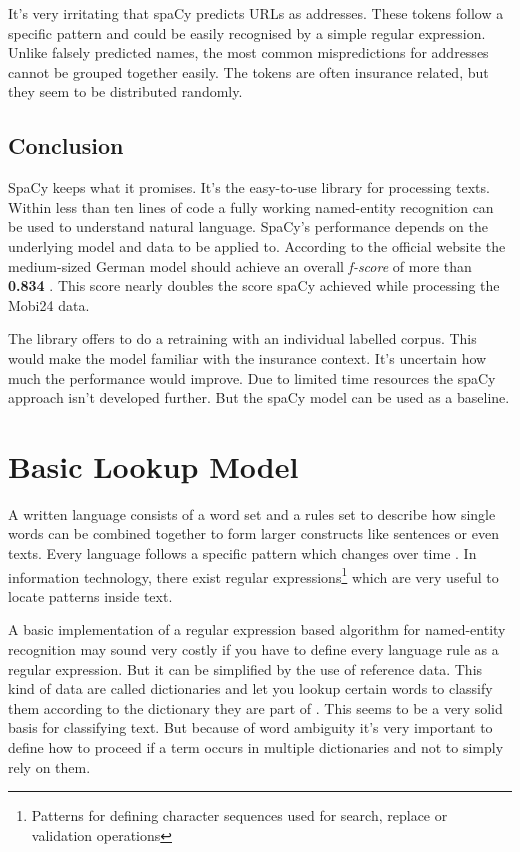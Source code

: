 It's very irritating that spaCy predicts URLs as addresses. These tokens follow a specific pattern and could be easily recognised by a simple regular expression. Unlike falsely predicted names, the most common mispredictions for addresses cannot be grouped together easily. The tokens are often insurance related, but they seem to be distributed randomly.

\subsection{Conclusion}

SpaCy keeps what it promises. It's the easy-to-use library for processing texts. Within less than ten lines of code a fully working named-entity recognition can be used to understand natural language. SpaCy's performance depends on the underlying model and data to be applied to. According to the official website the medium-sized German model should achieve an overall \emph{f-score} of more than \textbf{0.834} \cite{spacy}. This score nearly doubles the score spaCy achieved while processing the Mobi24 data.

The library offers to do a retraining with an individual labelled corpus. This would make the model familiar with the insurance context. It's uncertain how much the performance would improve. Due to limited time resources the spaCy approach isn't developed further. But the spaCy model can be used as a baseline.

\section{Basic Lookup Model}
\label{chap:regex-model}

A written language consists of a word set and a rules set to describe how single words can be combined together to form larger constructs like sentences or even texts. Every language follows a specific pattern which changes over time \cite{wiki05}. In information technology, there exist regular expressions\footnote{Patterns for defining character sequences used for search, replace or validation operations} which are very useful to locate patterns inside text.

A basic implementation of a regular expression based algorithm for named-entity recognition may sound very costly if you have to define every language rule as a regular expression. But it can be simplified by the use of reference data. This kind of data are called dictionaries and let you lookup certain words to classify them according to the dictionary they are part of \cite{nurz18}. This seems to be a very solid basis for classifying text. But because of word ambiguity it's very important to define how to proceed if a term occurs in multiple dictionaries and not to simply rely on them.

